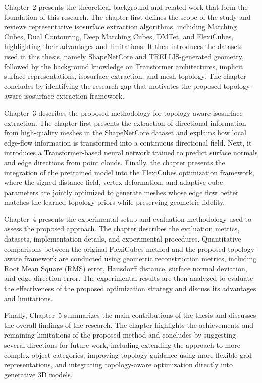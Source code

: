 \documentclass[../main.tex]{subfiles}
\begin{document}
Chapter~2 presents the theoretical background and related work that form the foundation of this research. The chapter first defines the scope of the study and reviews representative isosurface extraction algorithms, including Marching Cubes, Dual Contouring, Deep Marching Cubes, DMTet, and FlexiCubes, highlighting their advantages and limitations. It then introduces the datasets used in this thesis, namely ShapeNetCore and TRELLIS-generated geometry, followed by the background knowledge on Transformer architectures, implicit surface representations, isosurface extraction, and mesh topology. The chapter concludes by identifying the research gap that motivates the proposed topology-aware isosurface extraction framework.

Chapter~3 describes the proposed methodology for topology-aware isosurface extraction. The chapter first presents the extraction of directional information from high-quality meshes in the ShapeNetCore dataset and explains how local edge-flow information is transformed into a continuous directional field. Next, it introduces a Transformer-based neural network trained to predict surface normals and edge directions from point clouds. Finally, the chapter presents the integration of the pretrained model into the FlexiCubes optimization framework, where the signed distance field, vertex deformation, and adaptive cube parameters are jointly optimized to generate meshes whose edge flow better matches the learned topology priors while preserving geometric fidelity.

Chapter~4 presents the experimental setup and evaluation methodology used to assess the proposed approach. The chapter describes the evaluation metrics, datasets, implementation details, and experimental procedures. Quantitative comparisons between the original FlexiCubes method and the proposed topology-aware framework are conducted using geometric reconstruction metrics, including Root Mean Square (RMS) error, Hausdorff distance, surface normal deviation, and edge-direction error. The experimental results are then analyzed to evaluate the effectiveness of the proposed optimization strategy and discuss its advantages and limitations.

Finally, Chapter~5 summarizes the main contributions of the thesis and discusses the overall findings of the research. The chapter highlights the achievements and remaining limitations of the proposed method and concludes by suggesting several directions for future work, including extending the approach to more complex object categories, improving topology guidance using more flexible grid representations, and integrating topology-aware optimization directly into generative 3D models.
\end{document}
